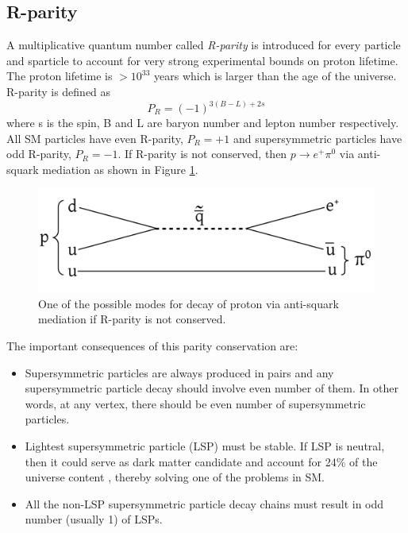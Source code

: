 \subsection{R-parity}
A multiplicative quantum number called \textit{R-parity} is introduced for every particle and sparticle to account for very strong experimental bounds on proton lifetime. The proton lifetime is $>10^{33}$ years \cite{PhysRevLett.102.141801} which is larger than the age of the universe.
R-parity is defined as
\begin{equation}
\label{eqn:rparity}
P_R = (-1)^{3(B-L)+2s}
\end{equation}
where s is the spin, B and L are baryon number and lepton number respectively. All SM particles have even R-parity, $P_R=+1$ and supersymmetric particles have odd R-parity, $P_R=-1$. If R-parity is not conserved, then $p\to e^+\pi^{0}$ via anti-squark mediation as shown in Figure \ref{fig:protonDecay}.
\begin{figure}[h!]
\centering
\includegraphics[width=0.7\linewidth]{../Figures/Chap1/protonDecay}
\caption[Proton decay diagram]{One of the possible modes for decay of proton via anti-squark mediation if R-parity is not conserved.}
\label{fig:protonDecay}
\end{figure}

The important consequences of this parity conservation are:
\begin{itemize}
\item Supersymmetric particles are always produced in pairs and any supersymmetric particle decay should involve even number of them. In other words, at any vertex, there should be even number of supersymmetric particles.
\item Lightest supersymmetric particle (LSP) must be stable. If LSP is neutral, then it could serve as dark matter candidate and account for 24\% of the universe content \cite{ELLIS1984453}, thereby solving one of the problems in SM.
\item All the non-LSP supersymmetric particle decay chains must result in odd number (usually 1) of LSPs.
\end{itemize}

